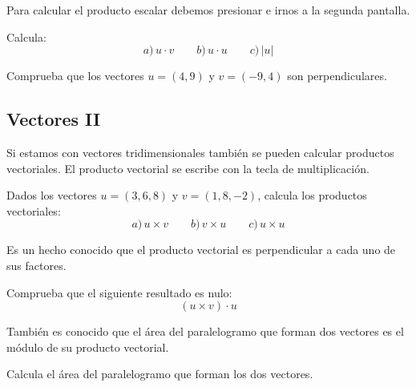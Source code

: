 \documentclass[12pt]{article}
\newcommand{\casiosymbol}[1]{{\footnotesize\casio\symbol{#1}}}
\newenvironment{capitulo}{\begin{tcolorbox}[colback=blue!5!white,colframe=red!75!black]}{\end{tcolorbox}\bigskip}
\newenvironment{ejer}{\begin{tcolorbox}[center title, 
fonttitle=\sffamily\bfseries,colback=blue!5,colframe=orange]}{\end{tcolorbox}}
\begin{document}
Para calcular el producto escalar debemos presionar \casiosymbol{84} e irnos a la segunda pantalla.

\begin{ejer}

Calcula:
\[
a)\, u \cdot v \qquad b)\, u\cdot u \qquad  c) \,|u|
\]

\end{ejer}

\begin{ejer}

Comprueba que los vectores $u=(4, 9)$ y $v=(-9,4)$ son perpendiculares.

\end{ejer}


\newpage

\begin{capitulo}
\section*{Vectores II}
\end{capitulo}
 

Si estamos con vectores tridimensionales también se pueden calcular productos vectoriales. El producto vectorial se escribe con la tecla de multiplicación.

\begin{ejer}

Dados los vectores $u=(3,6,8)$ y $v=(1,8,-2)$, calcula los productos vectoriales:
\[
a)\, u \times v  \qquad b) \, v\times u \qquad c)\, u\times u
\]

\end{ejer}

Es un hecho conocido que el producto vectorial es perpendicular a cada uno de sus factores.

\begin{ejer} 

Comprueba que el siguiente resultado es nulo:
\[
(u\times v)\cdot u
\]

\end{ejer}

También es conocido que el área del paralelogramo que forman dos vectores es el módulo de su producto vectorial.

\begin{ejer}

Calcula el área del paralelogramo que forman los dos vectores.

\end{ejer}
\end{document}
